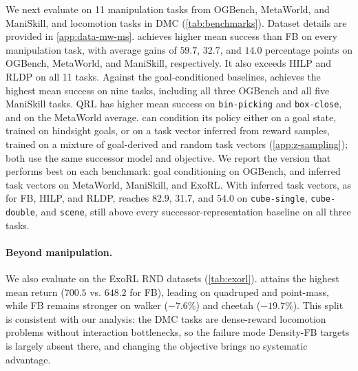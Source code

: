 We next evaluate \name{} on 11 manipulation tasks from OGBench, MetaWorld, and ManiSkill, and locomotion tasks in DMC (\cref{tab:benchmarks}).
Dataset details are provided in \cref{app:data-mw-ms}.
\name{} achieves higher mean success than FB on every manipulation task, with average gains of $59.7$, $32.7$, and $14.0$ percentage points on OGBench, MetaWorld, and ManiSkill, respectively. It also exceeds HILP and RLDP on all 11 tasks. Against the goal-conditioned baselines, \name{} achieves the highest mean success on nine tasks, including all three OGBench and all five ManiSkill tasks.
QRL has higher mean success on \texttt{bin-picking} and \texttt{box-close}, and on the MetaWorld average.
\name{} can condition its policy either on a goal state, trained on hindsight goals, or on a task vector inferred from reward samples, trained on a mixture of goal-derived and random task vectors (\cref{app:z-sampling}); both use the same successor model and objective.
We report the version that performs best on each benchmark: goal conditioning on OGBench, and inferred task vectors on MetaWorld, ManiSkill, and ExoRL.
With inferred task vectors, as for FB, HILP, and RLDP, \name{} reaches 82.9, 31.7, and 54.0 on \texttt{cube-single}, \texttt{cube-double}, and \texttt{scene}, still above every successor-representation baseline on all three tasks.

\paragraph{Beyond manipulation.}
We also evaluate \name{} on the ExoRL RND datasets (\cref{tab:exorl}).
\name{} attains the highest mean return ($700.5$ vs. $648.2$ for FB), leading on quadruped and point-mass, while FB remains stronger on walker ($-7.6\%$) and cheetah ($-19.7\%$). 
This split is consistent with our analysis: the DMC tasks are dense-reward locomotion problems without interaction bottlenecks, so the failure mode Density-FB targets is largely absent there, and changing the objective brings no systematic advantage.


